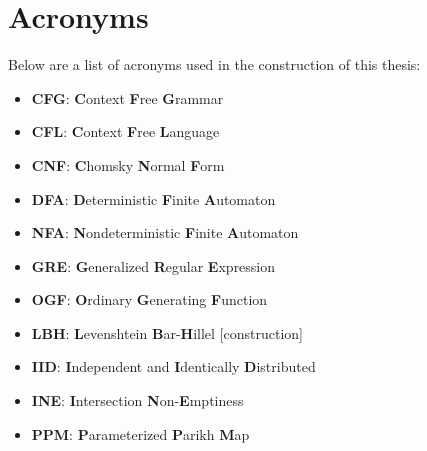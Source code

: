 \chapter*{\rm\bfseries Acronyms}
\label{ch:acronyms}

Below are a list of acronyms used in the construction of this thesis:

\begin{itemize}
    \item{\textbf{CFG}: \textbf{C}ontext \textbf{F}ree \textbf{G}rammar}
    \item{\textbf{CFL}: \textbf{C}ontext \textbf{F}ree \textbf{L}anguage}
    \item{\textbf{CNF}: \textbf{C}homsky \textbf{N}ormal \textbf{F}orm}
    \item{\textbf{DFA}: \textbf{D}eterministic \textbf{F}inite \textbf{A}utomaton}
    \item{\textbf{NFA}: \textbf{N}ondeterministic \textbf{F}inite \textbf{A}utomaton}
    \item{\textbf{GRE}: \textbf{G}eneralized \textbf{R}egular \textbf{E}xpression}
    \item{\textbf{OGF}: \textbf{O}rdinary \textbf{G}enerating \textbf{F}unction}
    \item{\textbf{LBH}: \textbf{L}evenshtein \textbf{B}ar-\textbf{H}illel [construction]}
    \item{\textbf{IID}: \textbf{I}ndependent and \textbf{I}dentically \textbf{D}istributed}
    \item{\textbf{INE}: \textbf{I}ntersection \textbf{N}on-\textbf{E}mptiness}
    \item{\textbf{PPM}: \textbf{P}arameterized \textbf{P}arikh \textbf{M}ap}
\end{itemize}
